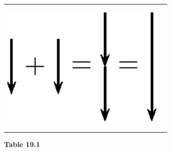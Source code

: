 \begin{center}
\begin{xtabular*}{\mytablewidth}[t]{|p{10\mystarwidth}|p{10\mystarwidth}|}
\label{m38813*id188657}
    \begin{center}
    \label{m38813*id188657!!!underscore!!!media}\label{m38813*id188657!!!underscore!!!printimage}\includegraphics[width=300px]{col11305.imgs/m38813_PG11C1_019.png} %
        
      \vspace{2pt}
    \vspace{.1in}
    
    \end{center}



    \addtocounter{footnote}{-0}
    
     \tabularnewline{}
    \end{xtabular*}
      \end{center}
    \begin{center}{\small\bfseries Table 19.1}\end{center}
    
    \addtocounter{footnote}{-0}
    
    \par
  
        
        
    
      
